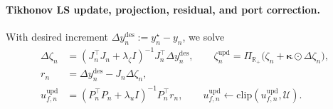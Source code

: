 \documentclass{article} %
\let\vec=\boldsymbol
\begin{document}
\paragraph{Tikhonov LS update, projection, residual, and port correction.}
With desired increment $\Delta y_n^{\mathrm{des}}:=y_n^\star-y_n$, we solve
\begin{align}
\label{eq:impl:tikhonov_update}
\Delta\zeta_n&=(J_n^\top J_n+\lambda_\zeta I)^{-1}J_n^\top \Delta y_n^{\mathrm{des}},\qquad
\zeta_n^{\mathrm{upd}}=\Pi_{\mathbb{R}_+}\big(\zeta_n+\vec{\kappa}\odot\Delta\zeta_n\big),\\
\label{eq:impl:residual}
r_n&=\Delta y_n^{\mathrm{des}}-J_n\Delta\zeta_n,\\
\label{eq:impl:port_update}
u_{f,n}^{\mathrm{upd}}&=(P_n^\top P_n+\lambda_u I)^{-1}P_n^\top r_n,\qquad
u_{f,n}^{\mathrm{upd}}\leftarrow \mathrm{clip}(u_{f,n}^{\mathrm{upd}},\mathcal{U}).
\end{align}
\end{document}
